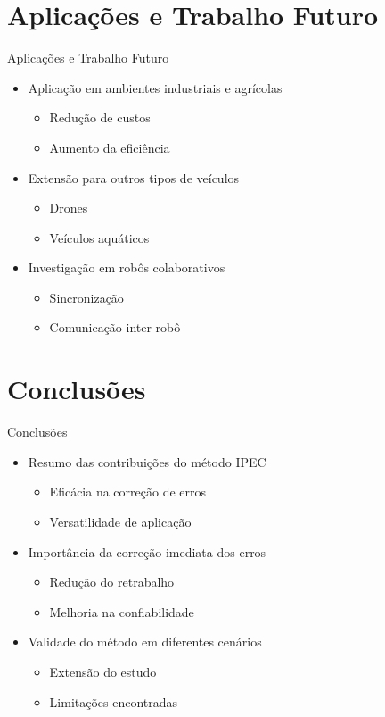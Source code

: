 \documentclass[xcolor=dvipsnames, aspectratio=169]{beamer}
\begin{document}
\section{Aplicações e Trabalho Futuro}
\begin{frame}{Aplicações e Trabalho Futuro}
  \begin{itemize}
    \item Aplicação em ambientes industriais e agrícolas
      \begin{itemize}
        \item Redução de custos
        \item Aumento da eficiência
      \end{itemize}
    \item Extensão para outros tipos de veículos
      \begin{itemize}
        \item Drones
        \item Veículos aquáticos
      \end{itemize}
    \item Investigação em robôs colaborativos
      \begin{itemize}
        \item Sincronização
        \item Comunicação inter-robô
      \end{itemize}
  \end{itemize}
\end{frame}


\section{Conclusões}
\begin{frame}{Conclusões}
  \begin{itemize}
    \item Resumo das contribuições do método IPEC
      \begin{itemize}
        \item Eficácia na correção de erros
        \item Versatilidade de aplicação
      \end{itemize}
    \item Importância da correção imediata dos erros
      \begin{itemize}
        \item Redução do retrabalho
        \item Melhoria na confiabilidade
      \end{itemize}
    \item Validade do método em diferentes cenários
      \begin{itemize}
        \item Extensão do estudo
        \item Limitações encontradas
      \end{itemize}
  \end{itemize}
\end{frame}
\end{document}
